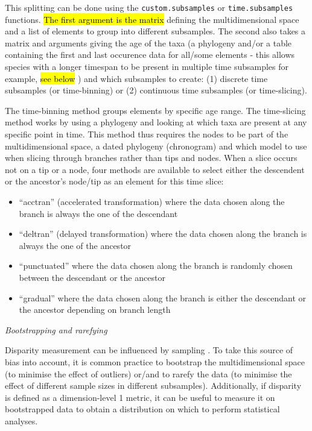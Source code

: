 \documentclass[12pt,letterpaper]{article}
\renewcommand{\subsection}[1]{%
\bigskip
\begin{center}
\begin{large}
\normalfont\itshape #1
\end{large}
\end{center}}
\begin{document}
This splitting can be done using the \texttt{custom.subsamples} or \texttt{time.subsamples} functions.
\hl{The first argument is the matrix}
defining the multidimensional space and a list of elements to group into different subsamples.
The second also takes a matrix and arguments giving the age of the taxa (a phylogeny and/or a table containing the first and last occurence data for all/some elements - this allows species with a longer timespan to be present in multiple time subsamples for example, 
\hl{see below}
) and which subsamples to create: (1) discrete time subsamples (or time-binning) or (2) continuous time subsamples (or time-slicing).

The time-binning method groups elements by specific age range.
The time-slicing method works by using a phylogeny and looking at which taxa are present at any specific point in time.
This method thus requires the nodes to be part of the multidimensional space, a dated phylogeny (chronogram) and which model to use when slicing through branches rather than tips and nodes.
When a slice occurs not on a tip or a node, four methods are available to select either the descendent or the ancestor's node/tip as an element for this time slice:
\begin{itemize}
    \item ``acctran'' (accelerated transformation) where the data chosen along the branch is always the one of the descendant
    \item ``deltran'' (delayed transformation) where the data chosen along the branch is always the one of the ancestor
    \item ``punctuated'' where the data chosen along the branch is randomly chosen between the descendant or the ancestor
    \item ``gradual'' where the data chosen along the branch is either the descendant or the ancestor depending on branch length
\end{itemize}

\subsection{Bootstrapping and rarefying}
Disparity measurement can be influenced by sampling \citep{Butler2012}.
To take this source of bias into account, it is common practice to bootstrap the multidimensional space (to minimise the effect of outliers) or/and to rarefy the data (to minimise the effect of different sample sizes in different subsamples).
Additionally, if disparity is defined as a dimension-level 1 metric, it can be useful to measure it on bootstrapped data to obtain a distribution on which to perform statistical analyses.
\end{document}
